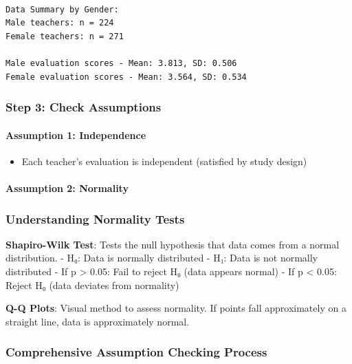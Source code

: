 \documentclass[11pt]{article}
\providecommand{\tightlist}{%
      \setlength{\itemsep}{0pt}\setlength{\parskip}{0pt}}
\begin{document}
    \begin{Verbatim}[commandchars=\\\{\}]

Data Summary by Gender:
Male teachers: n = 224
Female teachers: n = 271

Male evaluation scores - Mean: 3.813, SD: 0.506
Female evaluation scores - Mean: 3.564, SD: 0.534
    \end{Verbatim}

    \subsubsection{Step 3: Check
Assumptions}\label{step-3-check-assumptions}

\paragraph{Assumption 1: Independence}\label{assumption-1-independence}

\begin{itemize}
\tightlist
\item
  Each teacher's evaluation is independent (satisfied by study design)
\end{itemize}

\paragraph{Assumption 2: Normality}\label{assumption-2-normality}

    \subsubsection{Understanding Normality
Tests}\label{understanding-normality-tests}

\textbf{Shapiro-Wilk Test}: Tests the null hypothesis that data comes
from a normal distribution. - H₀: Data is normally distributed - H₁:
Data is not normally distributed - If p \textgreater{} 0.05: Fail to
reject H₀ (data appears normal) - If p \textless{} 0.05: Reject H₀ (data
deviates from normality)

\textbf{Q-Q Plots}: Visual method to assess normality. If points fall
approximately on a straight line, data is approximately normal.

    \subsubsection{\texorpdfstring{\textbf{Comprehensive Assumption Checking
Process}}{Comprehensive Assumption Checking Process}}\label{comprehensive-assumption-checking-process}
\end{document}
